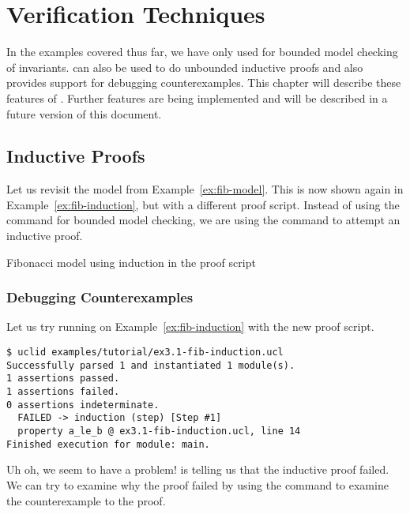 \chapter{Verification Techniques}
\label{ch:verif}

In the examples covered thus far, we have only used \uclid{} for bounded model checking of invariants. 
\uclid{} can also be used to do unbounded inductive proofs and also provides support for debugging counterexamples. This chapter will describe these features of \uclid{}. Further features are being implemented and will be described in a future version of this document.

\section{Inductive Proofs} %
Let us revisit the model from Example~\ref{ex:fib-model}. This is now shown again in Example~\ref{ex:fib-induction}, but with a different proof script. Instead of using the  command for bounded model checking, we are using the  command to attempt an inductive proof.

\begin{uclidlisting}[htbp]
    
    \label{ex:fib-induction}
    \caption{\uclid{} Fibonacci model using induction in the proof script}
\end{uclidlisting}

\subsection{Debugging Counterexamples}

Let us try running \uclid{} on Example~\ref{ex:fib-induction} with the new proof script.
\begin{Verbatim}[frame=single, samepage=true]
$ uclid examples/tutorial/ex3.1-fib-induction.ucl 
Successfully parsed 1 and instantiated 1 module(s).
1 assertions passed.
1 assertions failed.
0 assertions indeterminate.
  FAILED -> induction (step) [Step #1] 
  property a_le_b @ ex3.1-fib-induction.ucl, line 14
Finished execution for module: main.
\end{Verbatim}

Uh oh, we seem to have a problem! \uclid{} is telling us that the inductive proof failed. We can try to examine why the proof failed by using the  command to examine the counterexample to the proof.

